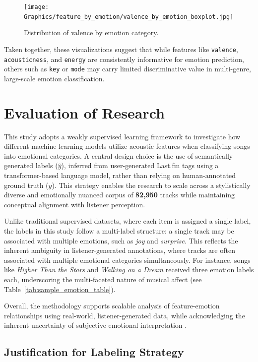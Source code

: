 \documentclass{article}
\begin{document}
\begin{figure}[H]
\centering
\texttt{[image: Graphics/feature\_by\_emotion/valence\_by\_emotion\_boxplot.jpg]}
\caption{Distribution of valence by emotion category.}
\label{fig:valence}
\end{figure}

Taken together, these visualizations suggest that while features like \texttt{valence}, \texttt{acousticness}, and \texttt{energy} are consistently informative for emotion prediction, others such as \texttt{key} or \texttt{mode} may carry limited discriminative value in multi-genre, large-scale emotion classification.

\section{Evaluation of Research}

This study adopts a weakly supervised learning framework to investigate how different machine learning models utilize acoustic features when classifying songs into emotional categories. A central design choice is the use of semantically generated labels ($\hat{y}$), inferred from user-generated Last.fm tags using a transformer-based language model, rather than relying on human-annotated ground truth ($y$). This strategy enables the research to scale across a stylistically diverse and emotionally nuanced corpus of \textbf{82,950} tracks while maintaining conceptual alignment with listener perception.

Unlike traditional supervised datasets, where each item is assigned a single label, the labels in this study follow a multi-label structure: a single track may be associated with multiple emotions, such as \textit{joy} and \textit{surprise}. This reflects the inherent ambiguity in listener-generated annotations, where tracks are often associated with multiple emotional categories simultaneously. For instance, songs like \textit{Higher Than the Stars} and \textit{Walking on a Dream} received three emotion labels each, underscoring the multi-faceted nature of musical affect (see Table~\ref{tab:sample_emotion_table}).

Overall, the methodology supports scalable analysis of feature-emotion relationships using real-world, listener-generated data, while acknowledging the inherent uncertainty of subjective emotional interpretation \parencite{Ahsan2015, Tuba2025}. 

\subsection{Justification for Labeling Strategy}
\end{document}
